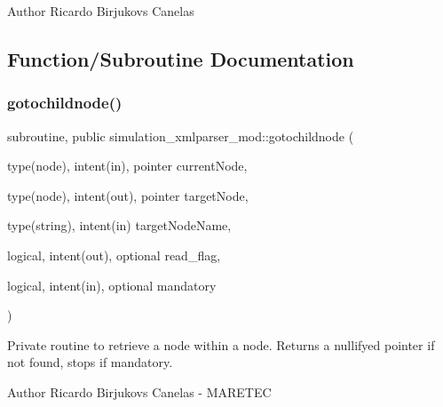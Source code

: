 \begin{DoxyAuthor}{Author}
Ricardo Birjukovs Canelas 
\end{DoxyAuthor}


\subsection{Function/\+Subroutine Documentation}
\mbox{\label{namespacesimulation__xmlparser__mod_a3167fcb99b40cdc25d2ba18418bd8b9f}} 
\subsubsection{\texorpdfstring{gotochildnode()}{gotochildnode()}}
{\footnotesize\ttfamily subroutine, public simulation\+\_\+xmlparser\+\_\+mod\+::gotochildnode (\begin{DoxyParamCaption}\item[{type(node), intent(in), pointer}]{current\+Node,  }\item[{type(node), intent(out), pointer}]{target\+Node,  }\item[{type(string), intent(in)}]{target\+Node\+Name,  }\item[{logical, intent(out), optional}]{read\+\_\+flag,  }\item[{logical, intent(in), optional}]{mandatory }\end{DoxyParamCaption})}



Private routine to retrieve a node within a node. Returns a nullifyed pointer if not found, stops if mandatory. 

\begin{DoxyAuthor}{Author}
Ricardo Birjukovs Canelas -\/ M\+A\+R\+E\+T\+EC 
\end{DoxyAuthor}

